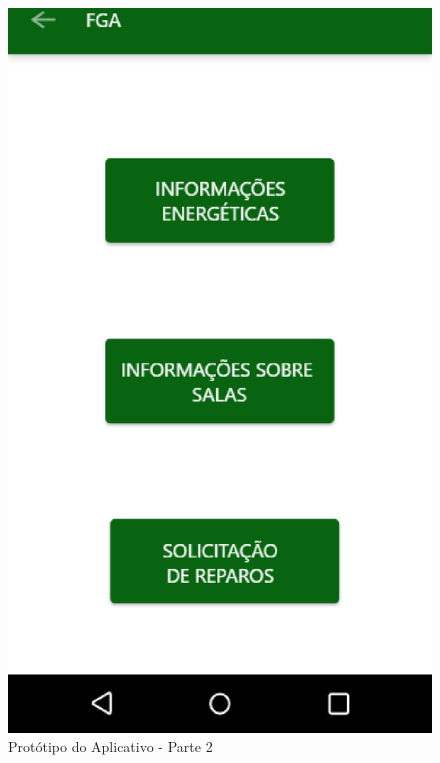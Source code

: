 \begin{anexosenv}
\begin{figure}[!h]
  \centering
  \includegraphics[keepaspectratio=true,scale=0.6]{figuras/prot-1.eps}
  \caption{Protótipo do Aplicativo - Parte 2}
\end{figure}


\end{anexosenv}
